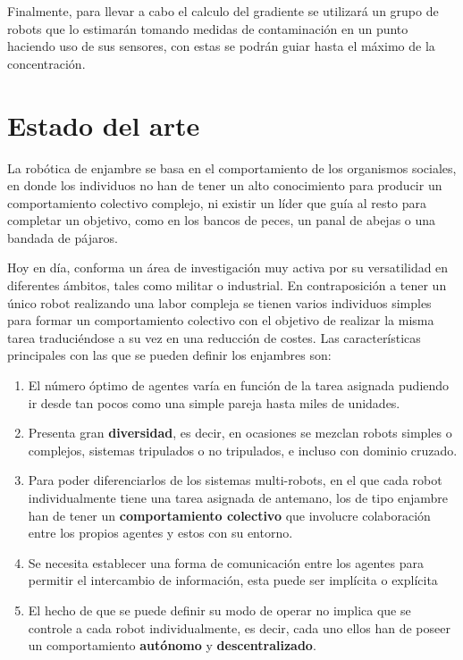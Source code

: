 Finalmente, para llevar a cabo el calculo del gradiente se utilizará un grupo de robots que lo estimarán tomando medidas de contaminación en un punto haciendo uso de sus sensores, con estas se podrán guiar hasta el máximo de la concentración.

\section{Estado del arte}\label{Objetives}

La robótica de enjambre se basa en el comportamiento de los organismos sociales, en donde los individuos no han de tener un alto conocimiento para producir un comportamiento colectivo complejo, ni existir un líder que guía al resto para completar un objetivo, como en los bancos de peces, un panal de abejas o una bandada de pájaros.

Hoy en día, conforma un área de investigación muy activa por su versatilidad en diferentes ámbitos, tales como militar o industrial. En contraposición a tener un único robot realizando una labor compleja se tienen varios individuos simples para formar un comportamiento colectivo con el objetivo de realizar la misma tarea traduciéndose a su vez en una reducción de costes. Las características principales con las que se pueden definir los enjambres son:

\begin{enumerate}
	\item El número óptimo de agentes varía en función de la tarea asignada pudiendo ir desde tan pocos como una simple pareja hasta miles de unidades.
	\item Presenta gran \textbf{diversidad}, es decir, en ocasiones se mezclan robots simples o complejos, sistemas tripulados o no tripulados, e incluso con dominio cruzado.
	\item Para poder diferenciarlos de los sistemas multi-robots, en el que cada robot individualmente tiene una tarea asignada de antemano, los de tipo enjambre han de tener un \textbf{comportamiento colectivo} que involucre colaboración entre los propios agentes y estos con su entorno.
	\item Se necesita establecer una forma de comunicación entre los agentes para permitir el intercambio de información, esta puede ser implícita o explícita
	\item El hecho de que se puede definir su modo de operar no implica que se controle a cada robot individualmente, es decir, cada uno ellos han de poseer un comportamiento \textbf{autónomo} y \textbf{descentralizado}.
\end{enumerate}

